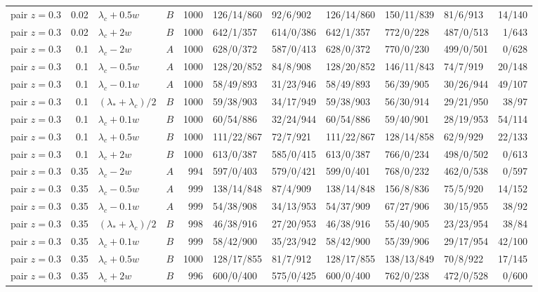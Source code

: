 \begin{longtable}{@{}lrllrlllllr@{}}
pair $z{=}0.3$ & 0.02 & $\lambda_c+0.5w$ & $B$ & 1000 & 126/14/860 & 92/6/902 & 126/14/860 & 150/11/839 & 81/6/913 & 14/140\\
pair $z{=}0.3$ & 0.02 & $\lambda_c+2w$ & $B$ & 1000 & 642/1/357 & 614/0/386 & 642/1/357 & 772/0/228 & 487/0/513 & 1/643\\
pair $z{=}0.3$ & 0.1 & $\lambda_c-2w$ & $A$ & 1000 & 628/0/372 & 587/0/413 & 628/0/372 & 770/0/230 & 499/0/501 & 0/628\\
pair $z{=}0.3$ & 0.1 & $\lambda_c-0.5w$ & $A$ & 1000 & 128/20/852 & 84/8/908 & 128/20/852 & 146/11/843 & 74/7/919 & 20/148\\
pair $z{=}0.3$ & 0.1 & $\lambda_c-0.1w$ & $A$ & 1000 & 58/49/893 & 31/23/946 & 58/49/893 & 56/39/905 & 30/26/944 & 49/107\\
pair $z{=}0.3$ & 0.1 & $(\lambda_*+\lambda_c)/2$ & $B$ & 1000 & 59/38/903 & 34/17/949 & 59/38/903 & 56/30/914 & 29/21/950 & 38/97\\
pair $z{=}0.3$ & 0.1 & $\lambda_c+0.1w$ & $B$ & 1000 & 60/54/886 & 32/24/944 & 60/54/886 & 59/40/901 & 28/19/953 & 54/114\\
pair $z{=}0.3$ & 0.1 & $\lambda_c+0.5w$ & $B$ & 1000 & 111/22/867 & 72/7/921 & 111/22/867 & 128/14/858 & 62/9/929 & 22/133\\
pair $z{=}0.3$ & 0.1 & $\lambda_c+2w$ & $B$ & 1000 & 613/0/387 & 585/0/415 & 613/0/387 & 766/0/234 & 498/0/502 & 0/613\\
pair $z{=}0.3$ & 0.35 & $\lambda_c-2w$ & $A$ & 994 & 597/0/403 & 579/0/421 & 599/0/401 & 768/0/232 & 462/0/538 & 0/597\\
pair $z{=}0.3$ & 0.35 & $\lambda_c-0.5w$ & $A$ & 999 & 138/14/848 & 87/4/909 & 138/14/848 & 156/8/836 & 75/5/920 & 14/152\\
pair $z{=}0.3$ & 0.35 & $\lambda_c-0.1w$ & $A$ & 999 & 54/38/908 & 34/13/953 & 54/37/909 & 67/27/906 & 30/15/955 & 38/92\\
pair $z{=}0.3$ & 0.35 & $(\lambda_*+\lambda_c)/2$ & $B$ & 998 & 46/38/916 & 27/20/953 & 46/38/916 & 55/40/905 & 23/23/954 & 38/84\\
pair $z{=}0.3$ & 0.35 & $\lambda_c+0.1w$ & $B$ & 999 & 58/42/900 & 35/23/942 & 58/42/900 & 55/39/906 & 29/17/954 & 42/100\\
pair $z{=}0.3$ & 0.35 & $\lambda_c+0.5w$ & $B$ & 1000 & 128/17/855 & 81/7/912 & 128/17/855 & 138/13/849 & 70/8/922 & 17/145\\
pair $z{=}0.3$ & 0.35 & $\lambda_c+2w$ & $B$ & 996 & 600/0/400 & 575/0/425 & 600/0/400 & 762/0/238 & 472/0/528 & 0/600\\

\end{longtable}
